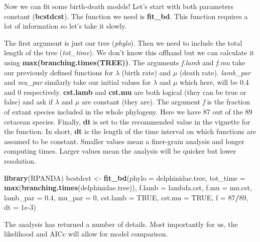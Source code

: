 \documentclass[
]{book}
\newenvironment{Shaded}{\begin{snugshade}}{\end{snugshade}}
\newcommand{\DataTypeTok}[1]{\textcolor[rgb]{0.13,0.29,0.53}{#1}}
\newcommand{\DecValTok}[1]{\textcolor[rgb]{0.00,0.00,0.81}{#1}}
\newcommand{\FloatTok}[1]{\textcolor[rgb]{0.00,0.00,0.81}{#1}}
\newcommand{\KeywordTok}[1]{\textcolor[rgb]{0.13,0.29,0.53}{\textbf{#1}}}
\newcommand{\NormalTok}[1]{#1}
\newcommand{\OperatorTok}[1]{\textcolor[rgb]{0.81,0.36,0.00}{\textbf{#1}}}
\newcommand{\OtherTok}[1]{\textcolor[rgb]{0.56,0.35,0.01}{#1}}
\newcommand{\StringTok}[1]{\textcolor[rgb]{0.31,0.60,0.02}{#1}}
\begin{document}
Now we can fit some birth-death models! Let's start with both parameters constant (\textbf{bcstdcst}). The function we need is \textbf{fit\_bd}. This function requires a lot of information so let's take it slowly.

The first argument is just our tree (\emph{phylo}). Then we need to include the total length of the tree (\emph{tot\_time}). We don't know this offhand but we can calculate it using \textbf{max(branching.times(TREE))}. The arguments \emph{f.lamb} and \emph{f.mu} take our previously defined functions for \(\lambda\) (birth rate) and \(\mu\) (death rate). \emph{lamb\_par} and \emph{mu\_par} similarly take our initial values for \(\lambda\) and \(\mu\) which here, will be 0.4 and 0 respectively. \textbf{cst.lamb} and \textbf{cst.mu} are both logical (they can be true or false) and ask if \(\lambda\) and \(\mu\) are constant (they are). The argument \emph{f} is the fraction of extant species included in the whole phylogeny. Here we have 87 out of the 89 cetacean species. Finally, \textbf{dt} is set to the recommended value in the vignette for the function. In short, \textbf{dt} is the length of the time interval on which functions are assumed to be constant. Smaller values mean a finer-grain analysis and longer computing times. Larger values mean the analysis will be quicker but lower resolution.

\begin{Shaded}
\begin{Highlighting}[]
\KeywordTok{library}\NormalTok{(RPANDA)}
\NormalTok{bcstdcst \textless{}{-}}\StringTok{ }\KeywordTok{fit\_bd}\NormalTok{(}\DataTypeTok{phylo =}\NormalTok{ delphinidae.tree, }
                   \DataTypeTok{tot\_time =} \KeywordTok{max}\NormalTok{(}\KeywordTok{branching.times}\NormalTok{(delphinidae.tree)),}
                   \DataTypeTok{f.lamb =}\NormalTok{ lambda.cst,}
                   \DataTypeTok{f.mu =}\NormalTok{ mu.cst,}
                   \DataTypeTok{lamb\_par =} \FloatTok{0.4}\NormalTok{,}
                   \DataTypeTok{mu\_par =} \DecValTok{0}\NormalTok{,}
                   \DataTypeTok{cst.lamb =} \OtherTok{TRUE}\NormalTok{,}
                   \DataTypeTok{cst.mu =} \OtherTok{TRUE}\NormalTok{,}
                   \DataTypeTok{f =} \DecValTok{87}\OperatorTok{/}\DecValTok{89}\NormalTok{,}
                   \DataTypeTok{dt =} \FloatTok{1e{-}3}\NormalTok{)}
\end{Highlighting}
\end{Shaded}

The analysis has returned a number of details. Most importantly for us, the likelihood and AICc will allow for model comparison.
\end{document}
